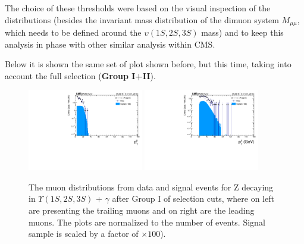 The choice of these thresholds were based on the visual inspection of the distributions (besides the invariant mass distribution of the dimuon system $M_{\mu\mu}$, which needs to be defined around the $\upsilon(1S, 2S, 3S)$ mass) and to keep this analysis in phase with other similar analysis within CMS.


Below it is shown the same set of plot shown before, but this time, taking into account the full selection (\textbf{Group I+II}).


\begin{figure}[!htbp]
\begin{center}
\includegraphics[width=0.45\textwidth]{figures_and_tables/outputPlots/ZtoUpsilon_Cat0_ZZZZZ/nEvts/data_x_mc/withKinCuts/h_withKin_TrailingMu_pt}\hspace*{1.cm}
\includegraphics[width=0.45\textwidth]{figures_and_tables/outputPlots/ZtoUpsilon_Cat0_ZZZZZ/nEvts/data_x_mc/withKinCuts/h_withKin_LeadingMu_pt}
\end{center}\vspace*{-.5cm}
\caption{The \PT muon distributions from data and signal events for Z decaying in $\Upsilon(1S,2S,3S)$ + $\gamma$ after Group I of selection cuts, where on left are presenting the trailing muons and on right are the leading muons. The plots are normalized to the number of events. Signal sample is scaled by a factor of $\times 100$).}
\label{fig:pTMuons_ZtoUpsilon_Cat0_groupI_plus_II}
\end{figure}



